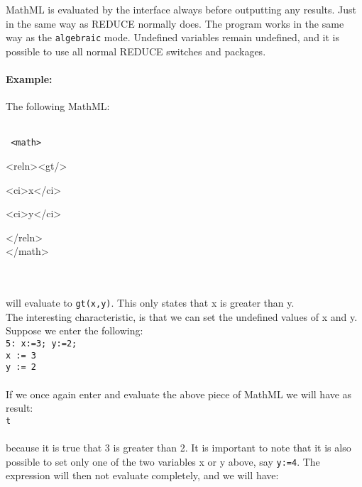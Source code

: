 \documentclass{article}
\begin{document}
MathML is evaluated by the interface always before outputting any results.
Just in the same way as REDUCE normally does. The program works in the same
way as the {\tt algebraic} mode. Undefined variables remain undefined,
and it is possible to use all normal REDUCE switches and packages.

\paragraph{Example:}

\noindent The following MathML:\\
\\
{\tt 
\hspace*{0mm}<math>

\hspace*{1mm}<reln><gt/>

\hspace*{6mm}<ci>x</ci>

\hspace*{6mm}<ci>y</ci>

\hspace*{1mm}</reln>
\\
\hspace*{0mm}</math>}
\\
\\
will evaluate to {\tt gt(x,y)}. This only states that x is greater than
y.
\\
The interesting characteristic, is that we can set the undefined values of
x and y.
\\
Suppose we enter the following:
\\

{\tt 5: x:=3; y:=2;
\\

x := 3
\\

y := 2}
\\
\\
If we once again enter and evaluate the above piece of MathML we will have as
result:
\\

{\tt t}
\\
\\
because it is true that 3 is greater than 2. It is important to note that
it is also possible to set only one of the two variables x or y above, say
{\tt y:=4}. The expression will then not evaluate completely, and we will
have:  \\
\end{document}
